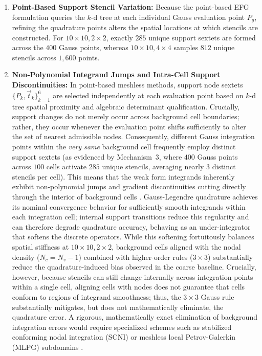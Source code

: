 \documentclass[preprint,12pt]{elsarticle}
\begin{document}
\begin{enumerate}
    \item \textbf{Point-Based Support Stencil Variation:} Because the point-based EFG formulation queries the $k$-d tree at each individual Gauss evaluation point $P_g$, refining the quadrature points alters the spatial locations at which stencils are constructed. For $10 \times 10, 2 \times 2$, exactly $285$ unique support sextets are formed across the $400$ Gauss points, whereas $10 \times 10, 4 \times 4$ samples $812$ unique stencils across $1{,}600$ points. 

    \item \textbf{Non-Polynomial Integrand Jumps and Intra-Cell Support Discontinuities:} In point-based meshless methods, support node sextets $\{P_k, \vec{t}_k\}_{k=1}^6$ are selected independently at each evaluation point based on $k$-d tree spatial proximity and algebraic determinant qualification. Crucially, support changes do not merely occur across background cell boundaries; rather, they occur whenever the evaluation point shifts sufficiently to alter the set of nearest admissible nodes. Consequently, different Gauss integration points within the \emph{very same} background cell frequently employ distinct support sextets (as evidenced by Mechanism~3, where $400$ Gauss points across $100$ cells activate $285$ unique stencils, averaging nearly $3$ distinct stencils per cell). This means that the weak form integrands inherently exhibit non-polynomial jumps and gradient discontinuities cutting directly through the interior of background cells \cite{belytschko1994element, dolbow1999numerical}. Gauss-Legendre quadrature achieves its nominal convergence behavior for sufficiently smooth integrands within each integration cell; internal support transitions reduce this regularity and can therefore degrade quadrature accuracy, behaving as an under-integrator that softens the discrete operators. While this softening fortuitously balances spatial stiffness at $10 \times 10, 2 \times 2$, background cells aligned with the nodal density ($N_c = N_v - 1$) combined with higher-order rules ($3 \times 3$) substantially reduce the quadrature-induced bias observed in the coarse baseline. Crucially, however, because stencils can still change internally across integration points within a single cell, aligning cells with nodes does not guarantee that cells conform to regions of integrand smoothness; thus, the $3 \times 3$ Gauss rule substantially mitigates, but does not mathematically eliminate, the quadrature error. A rigorous, mathematically exact elimination of background integration errors would require specialized schemes such as stabilized conforming nodal integration (SCNI) \cite{chen2001stabilized} or meshless local Petrov-Galerkin (MLPG) subdomains \cite{atluri2002meshless}.
\end{enumerate}
\end{document}
